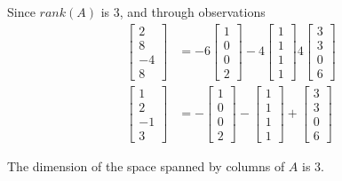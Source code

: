 \documentclass{article}
\theoremstyle{definition} %
\begin{document}
Since $rank(A)$ is 3, and through observations
\begin{align*}
    \begin{bmatrix}
        2 \\ 8 \\ -4 \\ 8
    \end{bmatrix}
    &=
    -6
    \begin{bmatrix}
        1 \\ 0 \\ 0 \\ 2
    \end{bmatrix}
    -4
    \begin{bmatrix}
        1 \\ 1 \\ 1 \\ 1
    \end{bmatrix}
    4
    \begin{bmatrix}
        3 \\ 3 \\ 0 \\ 6
    \end{bmatrix}
    \\
    \begin{bmatrix}
        1 \\ 2 \\ -1 \\ 3
    \end{bmatrix}
    &=
    -
    \begin{bmatrix}
        1 \\ 0 \\ 0 \\ 2
    \end{bmatrix}
    -
    \begin{bmatrix}
        1 \\ 1 \\ 1 \\ 1
    \end{bmatrix}
    +
    \begin{bmatrix}
        3 \\ 3 \\ 0 \\ 6
    \end{bmatrix}
\end{align*}

The dimension of the space spanned by columns of $A$ is 3.

\section{}
\end{document}
